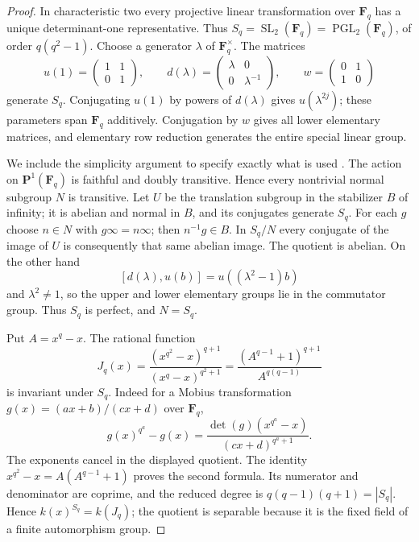 \begin{proof}
In characteristic two every projective linear transformation over
$\mathbf F_q$ has a unique determinant-one representative. Thus
$S_q=\operatorname{SL}_2(\mathbf F_q)=\operatorname{PGL}_2(\mathbf F_q)$,
of order $q(q^2-1)$. Choose a generator $\lambda$ of
$\mathbf F_q^\times$. The matrices
\[
 u(1)=\begin{pmatrix}1&1\\0&1\end{pmatrix},\qquad
 d(\lambda)=\begin{pmatrix}\lambda&0\\0&\lambda^{-1}\end{pmatrix},
 \qquad w=\begin{pmatrix}0&1\\1&0\end{pmatrix}
\]
generate $S_q$. Conjugating $u(1)$ by powers of $d(\lambda)$ gives
$u(\lambda^{2j})$; these parameters span $\mathbf F_q$ additively.
Conjugation by $w$ gives all lower elementary matrices, and elementary
row reduction generates the entire special linear group.

We include the simplicity argument to specify exactly what is used
\citep[Theorem 2.10 and Theorems 3.1--3.5, pp.~2--5]{C_ConradPSL}.
The action on $\mathbf P^1(\mathbf F_q)$ is faithful and doubly
transitive. Hence every nontrivial normal subgroup $N$ is transitive.
Let $U$ be the translation subgroup in the stabilizer $B$ of infinity;
it is abelian and normal in $B$, and its conjugates generate $S_q$.
For each $g$ choose $n\in N$ with $g\infty=n\infty$; then $n^{-1}g\in B$.
In $S_q/N$ every conjugate of the image of $U$ is consequently that
same abelian image. The quotient is abelian. On the other hand
\[
 [d(\lambda),u(b)]=u((\lambda^2-1)b)
\]
and $\lambda^2\ne1$, so the upper and lower elementary groups lie in
the commutator group. Thus $S_q$ is perfect, and $N=S_q$.

Put $A=x^q-x$. The rational function
\[
 J_q(x)=\frac{(x^{q^2}-x)^{q+1}}{(x^q-x)^{q^2+1}}
       =\frac{(A^{q-1}+1)^{q+1}}{A^{q(q-1)}}
\]
is invariant under $S_q$. Indeed for a Mobius transformation
$g(x)=(ax+b)/(cx+d)$ over $\mathbf F_q$,
\[
 g(x)^{q^a}-g(x)
 =\frac{\det(g)(x^{q^a}-x)}{(cx+d)^{q^a+1}}.
\]
The exponents cancel in the displayed quotient. The identity
$x^{q^2}-x=A(A^{q-1}+1)$ proves the second formula. Its numerator and
denominator are coprime, and the reduced degree is
$q(q-1)(q+1)=|S_q|$. Hence $k(x)^{S_q}=k(J_q)$; the quotient is
separable because it is the fixed field of a finite automorphism group.


\end{proof}
